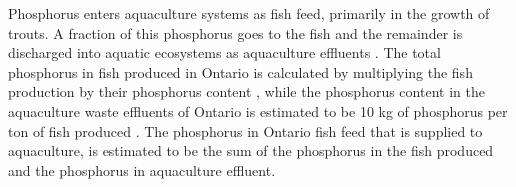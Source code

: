 \documentclass[]{elsarticle}
\begin{document}
Phosphorus enters aquaculture systems as fish feed, primarily in the growth of trouts. A fraction of this phosphorus goes to the fish and the remainder is discharged into aquatic ecosystems as aquaculture effluents
\citep{OntarioAquaculture}. 
The total phosphorus in fish produced in Ontario
is calculated by multiplying the fish production \citep{StatisticsCanadaAquaculture} by their phosphorus content \citep{CanadianNutrientFile}, while the phosphorus content in the aquaculture waste effluents of Ontario is estimated to be 10 kg of phosphorus per ton of fish produced \citep{bureau2003chemical}. The phosphorus in Ontario fish feed that is supplied to aquaculture, is estimated to be the sum of the phosphorus in the fish produced and the phosphorus in aquaculture effluent.
\end{document}
